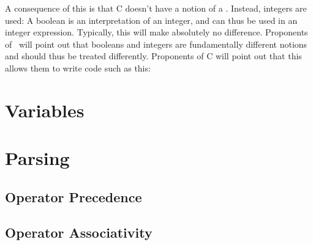 A consequence of this is that C doesn't have a notion of a . Instead, integers are used: A boolean is an interpretation of an integer, and can thus be used in an integer expression. Typically, this will make absolutely no difference. Proponents of \csharp\ will point out that booleans and integers are fundamentally different notions and should thus be treated differently. Proponents of C will point out that this allows them to write code such as this:



\section{Variables}
\csharpsubsection{\csharp}

\section{Parsing}
\subsection{Operator Precedence}
\subsection{Operator Associativity}


